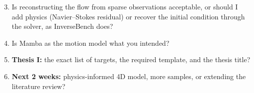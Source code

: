 \documentclass[10pt,a4paper]{article}
\begin{document}
\begin{qbox}
\begin{enumerate}\setcounter{enumi}{2}
\item Is reconstructing the flow from sparse observations acceptable, or should I add physics (Navier--Stokes
residual) or recover the initial condition through the solver, as InverseBench does?
\item Is Mamba as the motion model what you intended?
\end{enumerate}
\end{qbox}

\begin{qbox}
\begin{enumerate}\setcounter{enumi}{4}
\item \textbf{Thesis I:} the exact list of targets, the required template, and the thesis title?
\item \textbf{Next 2 weeks:} physics-informed 4D model, more samples, or extending the literature review?
\end{enumerate}
\end{qbox}
\end{document}

